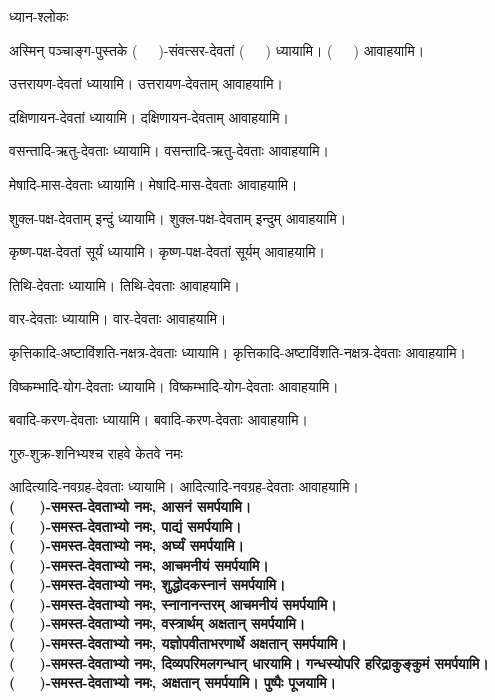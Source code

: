 





ध्यान-श्लोकः

\newcommand{\devataaM}{(~~~)}
\newcommand{\devataam}{(~~~)}
\newcommand{\devataayai}{(~~~)}
\newcommand{\devataadi}{(~~~)}
\newcommand{\yname}{(~~~)}

अस्मिन् पञ्चाङ्ग-पुस्तके \yname-संवत्सर-देवतां \devataaM{} ध्यायामि। \devataam{} आवाहयामि।

उत्तरायण-देवतां ध्यायामि। उत्तरायण-देवताम् आवाहयामि।

दक्षिणायन-देवतां ध्यायामि। दक्षिणायन-देवताम् आवाहयामि।

वसन्तादि-ऋतु-देवताः ध्यायामि। वसन्तादि-ऋतु-देवताः आवाहयामि।

मेषादि-मास-देवताः ध्यायामि। मेषादि-मास-देवताः आवाहयामि।

शुक्ल-पक्ष-देवताम् इन्दुं ध्यायामि। शुक्ल-पक्ष-देवताम् इन्दुम् आवाहयामि।

कृष्ण-पक्ष-देवतां सूर्यं ध्यायामि। कृष्ण-पक्ष-देवतां सूर्यम् आवाहयामि।

तिथि-देवताः ध्यायामि। तिथि-देवताः आवाहयामि।

वार-देवताः ध्यायामि। वार-देवताः आवाहयामि।

कृत्तिकादि-अष्टाविंशति-नक्षत्र-देवताः ध्यायामि। कृत्तिकादि-अष्टाविंशति-नक्षत्र-देवताः आवाहयामि।

विष्कम्भादि-योग-देवताः ध्यायामि। विष्कम्भादि-योग-देवताः आवाहयामि।

बवादि-करण-देवताः ध्यायामि। बवादि-करण-देवताः आवाहयामि।

{गुरु-शुक्र-शनिभ्यश्च राहवे केतवे नमः}

आदित्यादि-नवग्रह-देवताः ध्यायामि। आदित्यादि-नवग्रह-देवताः आवाहयामि।\\
\textbf{\devataadi-समस्त-देवताभ्यो नमः, आसनं समर्पयामि।}\\
\textbf{\devataadi-समस्त-देवताभ्यो नमः, पाद्यं समर्पयामि।}\\
\textbf{\devataadi-समस्त-देवताभ्यो नमः, अर्घ्यं समर्पयामि।}\\
\textbf{\devataadi-समस्त-देवताभ्यो नमः, आचमनीयं समर्पयामि।}\\
\textbf{\devataadi-समस्त-देवताभ्यो नमः, शुद्धोदकस्नानं समर्पयामि।}\\
\textbf{\devataadi-समस्त-देवताभ्यो नमः, स्नानानन्तरम् आचमनीयं समर्पयामि।}\\
\textbf{\devataadi-समस्त-देवताभ्यो नमः, वस्त्रार्थम् अक्षतान् समर्पयामि।}\\
\textbf{\devataadi-समस्त-देवताभ्यो नमः, यज्ञोपवीताभरणार्थे अक्षतान् समर्पयामि।}\\
\textbf{\devataadi-समस्त-देवताभ्यो नमः, दिव्यपरिमलगन्धान् धारयामि। गन्धस्योपरि हरिद्राकुङ्कुमं समर्पयामि।}\\
\textbf{\devataadi-समस्त-देवताभ्यो नमः, अक्षतान् समर्पयामि। पुष्पैः पूजयामि।}\\

